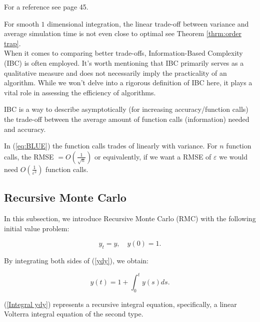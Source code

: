 \documentclass[a4paper,12pt]{article}
\begin{document}
\begin{related}
    For a reference see \cite{veach_robust_1997} page 45.
\end{related}

For smooth $1$ dimensional integration, the linear trade-off between
variance and average simulation time is not even close to optimal see
Theorem \ref{thrm:order trap}. \\
When it comes to comparing better trade-offs,
Information-Based Complexity (IBC) is often employed.
It's worth mentioning that IBC primarily serves as a
qualitative measure and does not necessarily imply the
practicality of an algorithm. While we won't delve into a
rigorous definition of IBC here, it plays a vital role in
assessing the efficiency of algorithms.

\begin{definition}
    IBC is a way to describe asymptotically (for increasing accuracy/function calls)
    the trade-off between the average amount of function calls (information)
    needed and accuracy.
\end{definition}

\begin{example}
    In (\ref{eq:BLUE}) the function calls trades of
    linearly with variance. For $n$ function calls,
    the RMSE $= O\left(\frac{1}{\sqrt{n}}\right)$ or equivalently, if we want a
    RMSE of $\varepsilon$ we would need $O\left(\frac{1}{\varepsilon^{2}}\right)$
    function calls.
\end{example}


\subsection{Recursive Monte Carlo}
In this subsection, we introduce Recursive Monte Carlo (RMC)
with the following  initial value problem:


\begin{equation} \label{ydy}
    y_t = y, \quad y(0) = 1.
\end{equation}


By integrating both sides of (\ref{ydy}), we obtain:

\begin{equation} \label{Integral ydy}
    y(t) = 1 + \int_{0}^{t} y(s) ds.
\end{equation}

(\ref{Integral ydy}) represents a recursive integral equation,
specifically, a linear Volterra integral equation of the second type.
\end{document}
